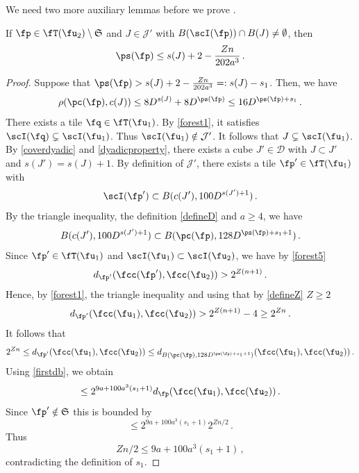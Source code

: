     We need two more auxiliary lemmas before we prove .

    \begin{lemma}
        \label{thin-scale-impact}
        \leanok
        If $\fp \in \fT(\fu_2) \setminus \mathfrak{S}$ and $J \in \mathcal{J'}$ with $B(\scI(\fp)) \cap B(J) \ne \emptyset$, then
        $$
            \ps(\fp) \le s(J) + 2 - \frac{Zn}{202a^3}\,.
        $$
    \end{lemma}

    \begin{proof}
        Suppose that $\ps(\fp) > s(J) + 2 -\frac{Zn}{202a^3} =: s(J) - s_1$. Then, we have
        $$
            \rho(\pc(\fp), c(J)) \le 8D^{s(J)}+8D^{\ps(\fp)} \le 16 D^{\ps(\fp) + s_1}\,.
        $$
        There exists a tile $\fq \in \fT(\fu_1)$. By \eqref{forest1}, it satisfies $\scI(\fq) \subsetneq \scI(\fu_1)$. Thus $\scI(\fu_1) \notin \mathcal{J}'$. It follows that $J \subsetneq \scI(\fu_1)$. By \eqref{coverdyadic} and \eqref{dyadicproperty}, there exists a cube $J' \in \mathcal{D}$ with $J \subset J'$ and $s(J') = s(J) + 1$. By definition of $\mathcal{J}'$, there exists a tile $\fp' \in \fT(\fu_1)$ with
        $$
            \scI(\fp') \subset B(c(J'), 100 D^{s(J') + 1})\,.
        $$
        By the triangle inequality, the definition \eqref{defineD} and $a \ge 4$, we have
        $$
            B(c(J'), 100 D^{s(J')+1}) \subset B(\pc(\fp), 128 D^{\ps(\fp) + s_1 + 1})\,.
        $$
        Since $\fp' \in \fT(\fu_1)$ and $\scI(\fu_1) \subset \scI(\fu_2)$, we have by \eqref{forest5}
        $$
            d_{\fp'}(\fcc(\fp'), \fcc(\fu_2)) > 2^{Z(n+1)}\,.
        $$
        Hence, by \eqref{forest1}, the triangle inequality and using that by \eqref{defineZ} $Z \ge 2$
        $$
            d_{\fp'}(\fcc(\fu_1), \fcc(\fu_2)) > 2^{Z(n+1)} - 4 \ge 2^{Zn}\,.
        $$
        It follows that
        $$
            2^{Zn} \le d_{\fp'}(\fcc(\fu_1), \fcc(\fu_2)) \le d_{B(\pc(\fp), 128 D^{\ps(\fp) + s_1+ 1})}(\fcc(\fu_1), \fcc(\fu_2))\,.
        $$
        Using \eqref{firstdb}, we obtain
        $$
            \le 2^{9a + 100a^3 (s_1+1)} d_{\fp}(\fcc(\fu_1), \fcc(\fu_2))\,.
        $$
        Since $\fp' \notin \mathfrak{S}$ this is bounded by
        $$
            \le 2^{9a + 100a^3 (s_1+1)} 2^{Zn/2}\,.
        $$
        Thus
        $$
            Z n/2 \le 9a + 100a^3(s_1 + 1)\,,
        $$
        contradicting the definition of $s_1$.
    \end{proof}

